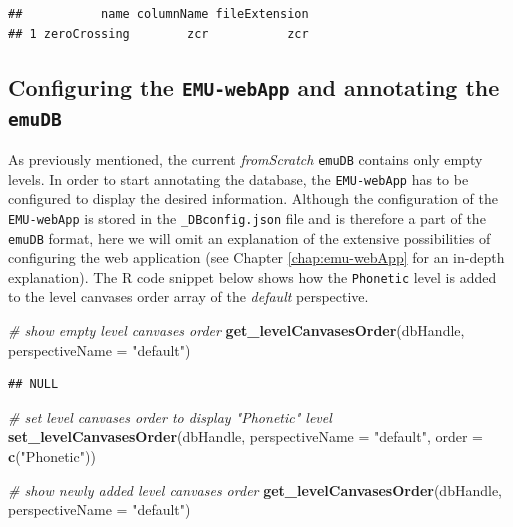 \documentclass[]{book}
\newenvironment{Shaded}{\begin{snugshade}}{\end{snugshade}}
\newcommand{\CommentTok}[1]{\textcolor[rgb]{0.56,0.35,0.01}{\textit{#1}}}
\newcommand{\DataTypeTok}[1]{\textcolor[rgb]{0.13,0.29,0.53}{#1}}
\newcommand{\KeywordTok}[1]{\textcolor[rgb]{0.13,0.29,0.53}{\textbf{#1}}}
\newcommand{\NormalTok}[1]{#1}
\newcommand{\StringTok}[1]{\textcolor[rgb]{0.31,0.60,0.02}{#1}}
\begin{document}
\begin{verbatim}
##           name columnName fileExtension
## 1 zeroCrossing        zcr           zcr
\end{verbatim}

\hypertarget{configuring-the-emu-webapp-and-annotating-the-emudb}{%
\subsection{\texorpdfstring{Configuring the \texttt{EMU-webApp} and annotating the \texttt{emuDB}}{Configuring the EMU-webApp and annotating the emuDB}}\label{configuring-the-emu-webapp-and-annotating-the-emudb}}

As previously mentioned, the current \emph{fromScratch} \texttt{emuDB} contains only empty levels. In order to start annotating the database, the \texttt{EMU-webApp} has to be configured to display the desired information. Although the configuration of the \texttt{EMU-webApp} is stored in the \texttt{\_DBconfig.json} file and is therefore a part of the \texttt{emuDB} format, here we will omit an explanation of the extensive possibilities of configuring the web application (see Chapter \ref{chap:emu-webApp} for an in-depth explanation). The R code snippet below shows how the \texttt{Phonetic} level is added to the level canvases order array of the \emph{default} perspective.

\begin{Shaded}
\begin{Highlighting}[]
\CommentTok{# show empty level canvases order}
\KeywordTok{get_levelCanvasesOrder}\NormalTok{(dbHandle, }\DataTypeTok{perspectiveName =} \StringTok{"default"}\NormalTok{)}
\end{Highlighting}
\end{Shaded}

\begin{verbatim}
## NULL
\end{verbatim}

\begin{Shaded}
\begin{Highlighting}[]
\CommentTok{# set level canvases order to display "Phonetic" level}
\KeywordTok{set_levelCanvasesOrder}\NormalTok{(dbHandle,}
                       \DataTypeTok{perspectiveName =} \StringTok{"default"}\NormalTok{,}
                       \DataTypeTok{order =} \KeywordTok{c}\NormalTok{(}\StringTok{"Phonetic"}\NormalTok{))}

\CommentTok{# show newly added level canvases order}
\KeywordTok{get_levelCanvasesOrder}\NormalTok{(dbHandle, }\DataTypeTok{perspectiveName =} \StringTok{"default"}\NormalTok{)}
\end{Highlighting}
\end{Shaded}
\end{document}
